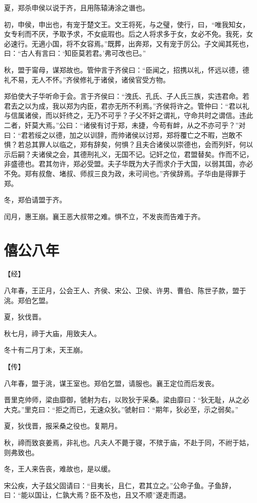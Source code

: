 \documentclass[a4paper,12pt,UTF8,twoside]{ctexbook}
\begin{document}
夏，郑杀申侯以说于齐，且用陈辕涛涂之谮也。

初，申侯，申出也，有宠于楚文王。文王将死，与之璧，使行，曰，“唯我知女，女专利而不厌，予取予求，不女疵瑕也。后之人将求多于女，女必不免。我死，女必速行。无適小国，将不女容焉。”既葬，出奔郑，又有宠于厉公。子文闻其死也，曰：“古人有言曰：‘知臣莫若君。’弗可改也已。”

秋，盟于甯母，谋郑故也。管仲言于齐侯曰：“臣闻之，招携以礼，怀远以德，德礼不易，无人不怀。”齐侯修礼于诸侯，诸侯官受方物。

郑伯使大子华听命于会。言于齐侯曰：“洩氏、孔氏、子人氏三族，实违君命。若君去之以为成，我以郑为内臣，君亦无所不利焉。”齐侯将许之。管仲曰：“君以礼与信属诸侯，而以奸终之，无乃不可乎？子父不奸之谓礼，守命共时之谓信。违此二者，奸莫大焉。”公曰：“诸侯有讨于郑，未捷，今苟有衅，从之不亦可乎？”对曰：“君若绥之以德，加之以训辞，而帅诸侯以讨郑，郑将覆亡之不暇，岂敢不惧？若总其罪人以临之，郑有辞矣，何惧？且夫合诸侯以崇德也，会而列奸，何以示后嗣？夫诸侯之会，其德刑礼义，无国不记。记奸之位，君盟替矣。作而不记，非盛德也。君其勿许，郑必受盟。夫子华既为大子而求介于大国，以弱其国，亦必不免。郑有叔詹、堵叔、师叔三良为政，未可间也。”齐侯辞焉。子华由是得罪于郑。

冬，郑伯请盟于齐。

闰月，惠王崩。襄王恶大叔带之难。惧不立，不发丧而告难于齐。

\section{僖公八年}


【经】

八年春，王正月，公会王人、齐侯、宋公、卫侯、许男、曹伯、陈世子款，盟于洮。郑伯乞盟。

夏，狄伐晋。

秋七月，禘于大庙，用致夫人。

冬十有二月丁未，天王崩。

【传】

八年春，盟于洮，谋王室也。郑伯乞盟，请服也。襄王定位而后发丧。

晋里克帅师，梁由靡御，虢射为右，以败狄于采桑。梁由靡曰：“狄无耻，从之必大克。”里克曰：“拒之而已，无速众狄。”虢射曰：“期年，狄必至，示之弱矣。”

夏，狄伐晋，报采桑之役也。复期月。

秋，禘而致哀姜焉，非礼也。凡夫人不薨于寝，不殡于庙，不赴于同，不祔于姑，则弗致也。

冬，王人来告丧，难故也，是以缓。

宋公疾，大子兹父固请曰：“目夷长，且仁，君其立之。”公命子鱼。子鱼辞，曰：“能以国让，仁孰大焉？臣不及也，且又不顺”遂走而退。
\end{document}
